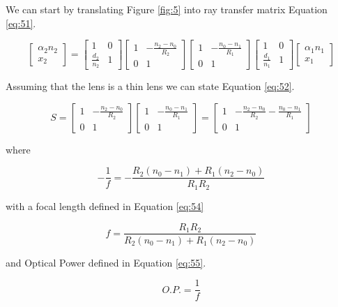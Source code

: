 \documentclass[main.tex]{subfiles}
\begin{document}
We can start by translating Figure \ref{fig:5} into ray transfer matrix Equation \ref{eq:51}.

\begin{equation}\label{eq:51}
\begin{bmatrix}
    \alpha_2 n_2 \\
    x_2
\end{bmatrix}
=
\begin{bmatrix}
    1                 &   0 \\
    \frac{d_2}{n_2}   &   1
\end{bmatrix}
\begin{bmatrix}
    1   & -\frac{n_2 - n_0}{R_2} \\
    0   &   1
\end{bmatrix}
\begin{bmatrix}
    1   & -\frac{n_0 - n_1}{R_1} \\
    0   &   1
\end{bmatrix}
\begin{bmatrix}
    1                 &   0 \\
    \frac{d_1}{n_1}   &   1
\end{bmatrix}
\begin{bmatrix}
    \alpha_{1}n_1  \\
    x_1
\end{bmatrix}
\end{equation}

Assuming that the lens is a thin lens we can state Equation \ref{eq:52}.

\begin{equation}\label{eq:52}
S
=
\begin{bmatrix}
    1   & -\frac{n_2 - n_0}{R_2} \\
    0   &   1
\end{bmatrix}
\begin{bmatrix}
    1   & -\frac{n_0 - n_1}{R_1} \\
    0   &   1
\end{bmatrix}
=
\begin{bmatrix}
    1   & -\frac{n_2 - n_0}{R_2} - \frac{n_0 - n_1}{R_1} \\
    0   &   1
\end{bmatrix}
\end{equation}

where

\begin{equation}\label{eq:53}
-\frac{1}{f} = -\frac{R_2(n_0 - n_1) + R_1(n_2 - n_0)}{R_1 R_2}
\end{equation}

with a focal length defined in Equation \ref{eq:54}

\begin{equation}\label{eq:54}
f = \frac{R_1 R_2}{R_2(n_0 - n_1) + R_1(n_2 - n_0)}
\end{equation}

and Optical Power defined in Equation \ref{eq:55}.

\begin{equation}\label{eq:55}
O.P. = \frac{1}{f}
\end{equation}
\end{document}
